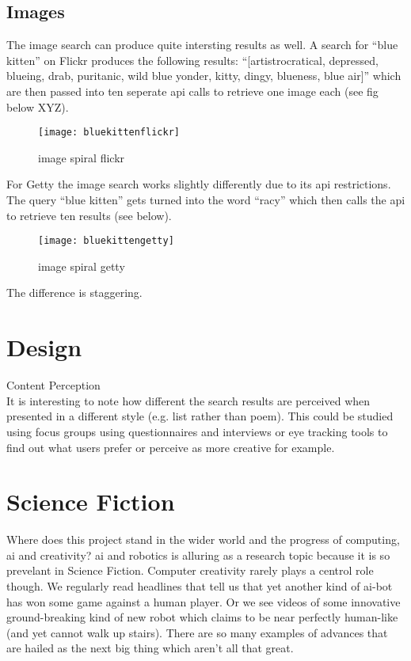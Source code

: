 \subsection{Images}

The image search can produce quite intersting results as well. A search for ``blue kitten'' on Flickr produces the following results: ``[artistrocratical, depressed, blueing, drab, puritanic, wild blue yonder, kitty, dingy, blueness, blue air]'' which are then passed into ten seperate \gls{api} calls to retrieve one image each (see fig below XYZ).

\begin{figure}[h!]
\centering
  \texttt{[image: bluekittenflickr]}
\caption[image spiral flickr]{image spiral flickr}
\label{fig:imgspiralflickr}
\end{figure}

For Getty the image search works slightly differently due to its \gls{api} restrictions. The query ``blue kitten'' gets turned into the word ``racy'' which then calls the \gls{api} to retrieve ten results (see below).

\begin{figure}[h!]
\centering
  \texttt{[image: bluekittengetty]}
\caption[image spiral getty]{image spiral getty}
\label{fig:imgspiralgetty}
\end{figure}

The difference is staggering.




\section{Design}

Content Perception\\
It is interesting to note how different the search results are perceived when presented in a different style (e.g. list rather than poem). This could be studied using focus groups using questionnaires and interviews or eye tracking tools to find out what users prefer or perceive as more creative for example.




\section{Science Fiction}

Where does this project stand in the wider world and the progress of computing, \gls{ai} and creativity? \gls{ai} and robotics is alluring as a research topic because it is so prevelant in Science Fiction. Computer creativity rarely plays a centrol role though. We regularly read headlines that tell us that yet another kind of \gls{ai}-bot has won some game against a human player. Or we see videos of some innovative ground-breaking kind of new robot which claims to be near perfectly human-like (and yet cannot walk up stairs). There are so many examples of advances that are hailed as the next big thing which aren't all that great. 

